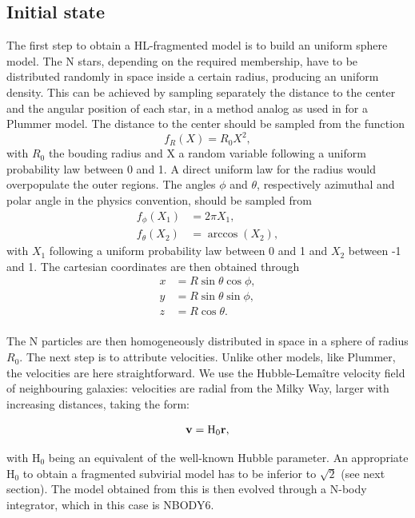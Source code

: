 \subsection{Initial state}

The first step to obtain a HL-fragmented model is to build an uniform sphere model. The N stars, depending on the required membership, have to be distributed randomly in space inside a certain radius, producing an uniform density. This can be achieved by sampling separately the distance to the center and the angular position of each star, in a method analog as used in \cite{Aarseth1974} for a Plummer model. The distance to the center should be sampled from the function
\begin{equation}
f_R(X) = R_0 X^2,
\end{equation} 
with $R_0$ the bouding radius and X a random variable following a uniform probability law between 0 and 1. A direct uniform law for the radius would overpopulate the outer regions. The angles $\phi$ and $\theta$, respectively azimuthal and polar angle in the physics convention, should be sampled from
\begin{align}
f_\phi(X_1) & = 2\pi X_1,\\
f_\theta(X_2) &= \arccos{ (X_2) },
\end{align}
with $X_1$ following a uniform probability law between 0 and 1 and $X_2$ between -1 and 1. The cartesian coordinates are then obtained through
\begin{align}
x &= R \sin{\theta} \cos{\phi},\\
y &= R \sin{\theta} \sin{\phi},\\
z &= R \cos{\theta}. \\
\end{align}

The N particles are then homogeneously distributed in space in a sphere of radius $R_0$. The next step is to attribute velocities. Unlike other models, like Plummer, the velocities are here straightforward. We use the Hubble-Lema\^itre velocity field of neighbouring galaxies: velocities are radial from the Milky Way, larger with increasing distances, taking the form:

\begin{equation}
\label{Eq:1_Hubble}
\bold{v} =  \textrm{H}_0 \bold{r},
\end{equation}

with H$_0$ being an equivalent of the well-known Hubble parameter. An appropriate H$_0$ to obtain a fragmented subvirial model has to be inferior to $\sqrt{2}$ (see next section). The model obtained from this is then evolved through a N-body integrator, which in this case is NBODY6.


